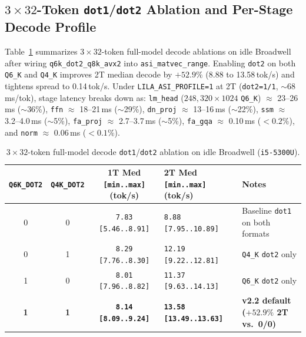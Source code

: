 \documentclass[11pt,a4paper]{article}
\begin{document}
\subsection{\texorpdfstring{$3 \times 32$}{3x32}-Token \texttt{dot1}/\texttt{dot2} Ablation and Per-Stage Decode Profile}
Table~\ref{tab:dot2_ablation} summarizes $3 \times 32$-token full-model decode ablations on idle Broadwell after wiring \texttt{q6k\_dot2\_q8k\_avx2} into \texttt{asi\_matvec\_range}. Enabling \texttt{dot2} on both \texttt{Q6\_K} and \texttt{Q4\_K} improves 2T median decode by \textbf{$+52.9\%$} (8.88 to 13.58\,tok/s) and tightens spread to 0.14\,tok/s. Under \texttt{LILA\_ASI\_PROFILE=1} at 2T (\texttt{dot2=1/1}, $\sim$68\,ms/tok), stage latency breaks down as: \texttt{lm\_head} ($248{,}320 \times 1024$ \texttt{Q6\_K}) $\approx$ 23--26\,ms ($\sim$36\%), \texttt{ffn} $\approx$ 18--21\,ms ($\sim$29\%), \texttt{dn\_proj} $\approx$ 13--16\,ms ($\sim$22\%), \texttt{ssm} $\approx$ 3.2--4.0\,ms ($\sim$5\%), \texttt{fa\_proj} $\approx$ 2.7--3.7\,ms ($\sim$5\%), \texttt{fa\_gqa} $\approx$ 0.10\,ms ($<0.2\%$), and \texttt{norm} $\approx$ 0.06\,ms ($<0.1\%$).

\begin{table}[h]
\centering
\small
\begin{tabular}{@{}cccll@{}}
\toprule
\texttt{Q6K\_DOT2} & \texttt{Q4K\_DOT2} & 1T Med \texttt{[min..max]} (tok/s) & 2T Med \texttt{[min..max]} (tok/s) & Notes \\
\midrule
0 & 0 & \texttt{7.83 [5.46..8.91]} & \texttt{8.88 [7.95..10.89]} & Baseline \texttt{dot1} on both formats \\
0 & 1 & \texttt{8.29 [7.76..8.30]} & \texttt{12.19 [9.22..12.81]} & \texttt{Q4\_K} \texttt{dot2} only \\
1 & 0 & \texttt{8.01 [7.96..8.82]} & \texttt{11.37 [9.63..14.13]} & \texttt{Q6\_K} \texttt{dot2} only \\
\textbf{1} & \textbf{1} & \textbf{\texttt{8.14 [8.09..9.24]}} & \textbf{\texttt{13.58 [13.49..13.63]}} & \textbf{v2.2 default ($+52.9\%$ 2T vs.\ 0/0)} \\
\bottomrule
\end{tabular}
\caption{$3 \times 32$-token full-model decode \texttt{dot1}/\texttt{dot2} ablation on idle Broadwell (\texttt{i5-5300U}).}
\label{tab:dot2_ablation}
\end{table}
\end{document}
